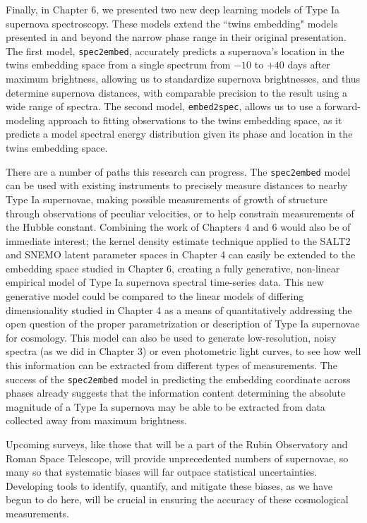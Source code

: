 Finally, in Chapter 6, we presented two new deep learning models of Type Ia supernova spectroscopy. These models extend the ``twins embedding" models presented in \citet{boone_twins_2020a} and \citet{boone_twins_2020b} beyond the narrow phase range in their original presentation. The first model, \texttt{spec2embed}, accurately predicts a supernova's location in the twins embedding space from a single spectrum from $-10$ to $+40$ days after maximum brightness, allowing us to standardize supernova brightnesses, and thus determine supernova distances, with comparable precision to the \citet{boone_twins_2020b} result using a wide range of spectra. The second model, \texttt{embed2spec}, allows us to use a forward-modeling approach to fitting observations to the twins embedding space, as it predicts a model spectral energy distribution given its phase and location in the twins embedding space.

There are a number of paths this research can progress. The \texttt{spec2embed} model can be used with existing instruments to precisely measure distances to nearby Type Ia supernovae, making possible measurements of growth of structure through observations of peculiar velocities, or to help constrain measurements of the Hubble constant. Combining the work of Chapters 4 and 6 would also be of immediate interest; the kernel density estimate technique applied to the SALT2 and SNEMO latent parameter spaces in Chapter 4 can easily be extended to the embedding space studied in Chapter 6, creating a fully generative, non-linear empirical model of Type Ia supernova spectral time-series data. This new generative model could be compared to the linear models of differing dimensionality studied in Chapter 4 as a means of quantitatively addressing the open question of the proper parametrization or description of Type Ia supernovae for cosmology. This model can also be used to generate low-resolution, noisy spectra (as we did in Chapter 3) or even photometric light curves, to see how well this information can be extracted from different types of measurements. The success of the \texttt{spec2embed} model in predicting the embedding coordinate across phases already suggests that the information content determining the absolute magnitude of a Type Ia supernova may be able to be extracted from data collected away from maximum brightness.

Upcoming surveys, like those that will be a part of the Rubin Observatory and Roman Space Telescope, will provide unprecedented numbers of supernovae, so many so that systematic biases will far outpace statistical uncertainties. Developing tools to identify, quantify, and mitigate these biases, as we have begun to do here, will be crucial in ensuring the accuracy of these cosmological measurements.
